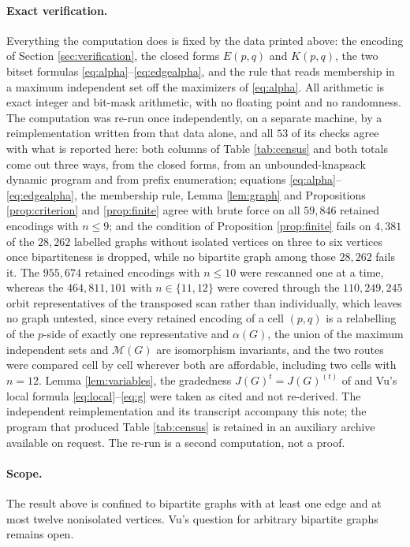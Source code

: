 \documentclass[11pt]{amsart}
\newcommand{\M}{\mathcal M}
\begin{document}
\paragraph{Exact verification.}
Everything the computation does is fixed by the data printed above: the encoding
of Section \ref{sec:verification}, the closed forms $E(p,q)$ and $K(p,q)$, the
two bitset formulas \eqref{eq:alpha}--\eqref{eq:edgealpha}, and the rule that
reads membership in a maximum independent set off the maximizers of
\eqref{eq:alpha}. All arithmetic is exact integer and bit-mask arithmetic, with
no floating point and no randomness. The computation was re-run once
independently, on a separate machine, by a reimplementation written from that
data alone, and all $53$ of its checks agree with what is reported here: both
columns of Table \ref{tab:census} and both totals come out three ways, from the
closed forms, from an unbounded-knapsack dynamic program and from prefix
enumeration; equations \eqref{eq:alpha}--\eqref{eq:edgealpha}, the membership
rule, Lemma \ref{lem:graph} and Propositions \ref{prop:criterion} and
\ref{prop:finite} agree with brute force on all $59{,}846$ retained encodings
with $n\leq9$; and the condition of Proposition \ref{prop:finite} fails on
$4{,}381$ of the $28{,}262$ labelled graphs without isolated vertices on three
to six vertices once bipartiteness is dropped, while no bipartite graph among
those $28{,}262$ fails it. The
$955{,}674$ retained encodings with $n\leq10$ were rescanned one at a time,
whereas the $464{,}811{,}101$ with $n\in\{11,12\}$ were covered through the
$110{,}249{,}245$ orbit representatives of the transposed scan rather than
individually, which leaves no graph untested, since every retained encoding of a
cell $(p,q)$ is a relabelling of the $p$-side of exactly one representative and
$\alpha(G)$, the union of the maximum independent sets and $\M(G)$ are
isomorphism invariants, and the two routes were compared cell by cell wherever
both are affordable, including two cells with $n=12$. Lemma
\ref{lem:variables}, the gradedness $J(G)^t=J(G)^{(t)}$ of \cite{HHT} and Vu's
local formula \eqref{eq:local}--\eqref{eq:g} were taken as cited and not
re-derived. The independent reimplementation and its transcript accompany this
note; the program that produced Table \ref{tab:census} is retained in an
auxiliary archive available on request. The re-run is a second computation, not
a proof.

\paragraph{Scope.}
The result above is confined to bipartite graphs with at least one edge and at
most twelve nonisolated vertices. Vu's question for arbitrary bipartite graphs
remains open.
\end{document}
